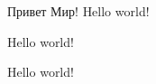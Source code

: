 \documentclass{article}
\begin{document}
Привет Мир! \foreignlanguage{english}{Hello world!}

\begin{english}
Hello world!
\end{english}

Hello world!
\end{document}
